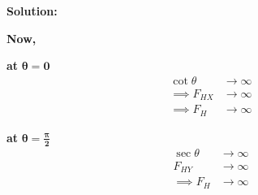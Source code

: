 \documentclass{article}
\theoremstyle{definition}
\newenvironment{solution}
  {\par\vspace{0.5em}\noindent\textbf{Solution:}\par\nopagebreak\vspace{0.3em}}
  {\par\vspace{1em}}
\begin{document}
\begin{solution}
    \vspace{1em}
    \noindent
    \textbf{Now,}
    
    \vspace{0.5em}
    \noindent
    \begin{minipage}[t]{0.48\textwidth}
    \textbf{at } $\mathbf{\theta = 0}$
    \begin{align*}
    \cot\theta &\to \infty \\
    \implies F_{HX} &\to \infty \\
    \implies F_H &\to \infty
    \end{align*}
    \end{minipage}%
    \hfill
    \begin{minipage}[t]{0.48\textwidth}
    \textbf{at } $\mathbf{\theta = \frac{\pi}{2}}$
    \begin{align*}
    \sec\theta &\to \infty \\
    F_{HY} &\to \infty \\
    \implies F_H &\to \infty
    \end{align*}
    \end{minipage}
\end{solution}
\end{document}
